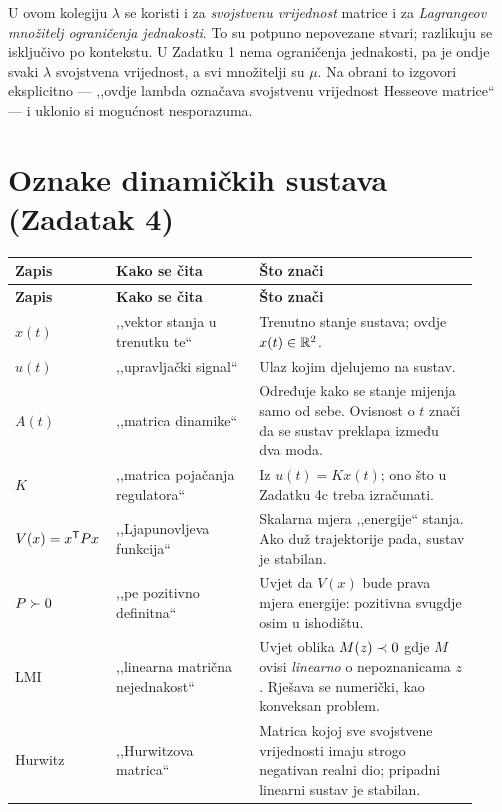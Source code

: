 \begin{zamka}
U ovom kolegiju $\lambda$ se koristi i za \emph{svojstvenu vrijednost} matrice i
za \emph{Lagrangeov množitelj ograničenja jednakosti}. To su potpuno nepovezane
stvari; razlikuju se isključivo po kontekstu. U Zadatku 1 nema ograničenja
jednakosti, pa je ondje svaki $\lambda$ svojstvena vrijednost, a svi množitelji
su $\mu$. Na obrani to izgovori eksplicitno --- ,,ovdje lambda označava svojstvenu
vrijednost Hesseove matrice`` --- i uklonio si mogućnost nesporazuma.
\end{zamka}

\section{Oznake dinamičkih sustava (Zadatak 4)}
\label{sec:oznake-dinamika}

\begin{longtable}{@{}p{0.16\linewidth} p{0.30\linewidth} p{0.46\linewidth}@{}}
\toprule
\textbf{Zapis} & \textbf{Kako se čita} & \textbf{Što znači} \\
\midrule
\endfirsthead
\toprule
\textbf{Zapis} & \textbf{Kako se čita} & \textbf{Što znači} \\
\midrule
\endhead
$x(t)$ & ,,vektor stanja u trenutku te`` & Trenutno stanje sustava; ovdje $x(t) \in \mathbb{R}^2$. \\[4pt]
$u(t)$ & ,,upravljački signal`` & Ulaz kojim djelujemo na sustav. \\[4pt]
$A(t)$ & ,,matrica dinamike`` & Određuje kako se stanje mijenja samo od sebe. Ovisnost o $t$ znači da se sustav preklapa između dva moda. \\[4pt]
$K$ & ,,matrica pojačanja regulatora`` & Iz $u(t) = Kx(t)$; ono što u Zadatku 4c treba izračunati. \\[4pt]
$V(x) = x^{\mathsf{T}} P x$ & ,,Ljapunovljeva funkcija`` & Skalarna mjera ,,energije`` stanja. Ako duž trajektorije pada, sustav je stabilan. \\[4pt]
$P \succ 0$ & ,,pe pozitivno definitna`` & Uvjet da $V(x)$ bude prava mjera energije: pozitivna svugdje osim u ishodištu. \\[4pt]
LMI & ,,linearna matrična nejednakost`` & Uvjet oblika $M(z) \prec 0$ gdje $M$ ovisi \emph{linearno} o nepoznanicama $z$. Rješava se numerički, kao konveksan problem. \\[4pt]
Hurwitz & ,,Hurwitzova matrica`` & Matrica kojoj sve svojstvene vrijednosti imaju strogo negativan realni dio; pripadni linearni sustav je stabilan. \\
\bottomrule
\end{longtable}

